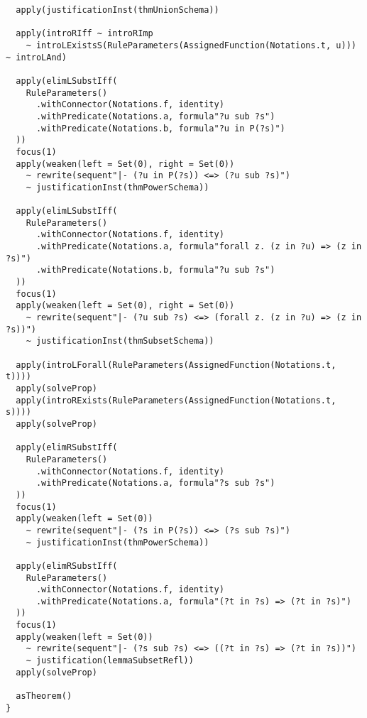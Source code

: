 \begin{lstlisting}
  apply(justificationInst(thmUnionSchema))

  apply(introRIff ~ introRImp
    ~ introLExistsS(RuleParameters(AssignedFunction(Notations.t, u))) ~ introLAnd)

  apply(elimLSubstIff(
    RuleParameters()
      .withConnector(Notations.f, identity)
      .withPredicate(Notations.a, formula"?u sub ?s")
      .withPredicate(Notations.b, formula"?u in P(?s)")
  ))
  focus(1)
  apply(weaken(left = Set(0), right = Set(0))
    ~ rewrite(sequent"|- (?u in P(?s)) <=> (?u sub ?s)")
    ~ justificationInst(thmPowerSchema))

  apply(elimLSubstIff(
    RuleParameters()
      .withConnector(Notations.f, identity)
      .withPredicate(Notations.a, formula"forall z. (z in ?u) => (z in ?s)")
      .withPredicate(Notations.b, formula"?u sub ?s")
  ))
  focus(1)
  apply(weaken(left = Set(0), right = Set(0))
    ~ rewrite(sequent"|- (?u sub ?s) <=> (forall z. (z in ?u) => (z in ?s))")
    ~ justificationInst(thmSubsetSchema))

  apply(introLForall(RuleParameters(AssignedFunction(Notations.t, t))))
  apply(solveProp)
  apply(introRExists(RuleParameters(AssignedFunction(Notations.t, s))))
  apply(solveProp)

  apply(elimRSubstIff(
    RuleParameters()
      .withConnector(Notations.f, identity)
      .withPredicate(Notations.a, formula"?s sub ?s")
  ))
  focus(1)
  apply(weaken(left = Set(0))
    ~ rewrite(sequent"|- (?s in P(?s)) <=> (?s sub ?s)")
    ~ justificationInst(thmPowerSchema))

  apply(elimRSubstIff(
    RuleParameters()
      .withConnector(Notations.f, identity)
      .withPredicate(Notations.a, formula"(?t in ?s) => (?t in ?s)")
  ))
  focus(1)
  apply(weaken(left = Set(0))
    ~ rewrite(sequent"|- (?s sub ?s) <=> ((?t in ?s) => (?t in ?s))")
    ~ justification(lemmaSubsetRefl))
  apply(solveProp)

  asTheorem()
}
\end{lstlisting}